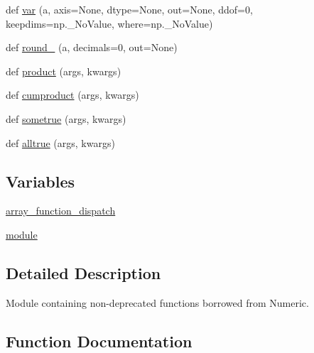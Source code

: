 \begin{DoxyCompactItemize}
\item 
def \hyperlink{namespacenumpy_1_1core_1_1fromnumeric_afee4e68150f0d18870f470901cfb2977}{var} (a, axis=None, dtype=None, out=None, ddof=0, keepdims=np.\+\_\+\+No\+Value, where=np.\+\_\+\+No\+Value)
\item 
def \hyperlink{namespacenumpy_1_1core_1_1fromnumeric_a5f56c2d021bee41046d2728b0ba05631}{round\+\_\+} (a, decimals=0, out=None)
\item 
def \hyperlink{namespacenumpy_1_1core_1_1fromnumeric_ac310d5de9912adf97d33010d490e278b}{product} (args, kwargs)
\item 
def \hyperlink{namespacenumpy_1_1core_1_1fromnumeric_ac9edcdc33c8976bbff52028d0bcee511}{cumproduct} (args, kwargs)
\item 
def \hyperlink{namespacenumpy_1_1core_1_1fromnumeric_a4f3056b85b37b338f8be3268759b64a9}{sometrue} (args, kwargs)
\item 
def \hyperlink{namespacenumpy_1_1core_1_1fromnumeric_a437e5f6dc0351546bb9edf2f7b6ffc70}{alltrue} (args, kwargs)
\end{DoxyCompactItemize}
\subsection*{Variables}
\begin{DoxyCompactItemize}
\item 
\hyperlink{namespacenumpy_1_1core_1_1fromnumeric_ab2d6e3b11669e7f56523052edd3f88f6}{array\+\_\+function\+\_\+dispatch}
\item 
\hyperlink{namespacenumpy_1_1core_1_1fromnumeric_ae894f2d3c8e99e7d337ef4eca0a41548}{module}
\end{DoxyCompactItemize}


\subsection{Detailed Description}
\begin{DoxyVerb}Module containing non-deprecated functions borrowed from Numeric.\end{DoxyVerb}
 

\subsection{Function Documentation}
\mbox{\label{namespacenumpy_1_1core_1_1fromnumeric_aa295eac234c7db87c9644317b7c529af}} 
